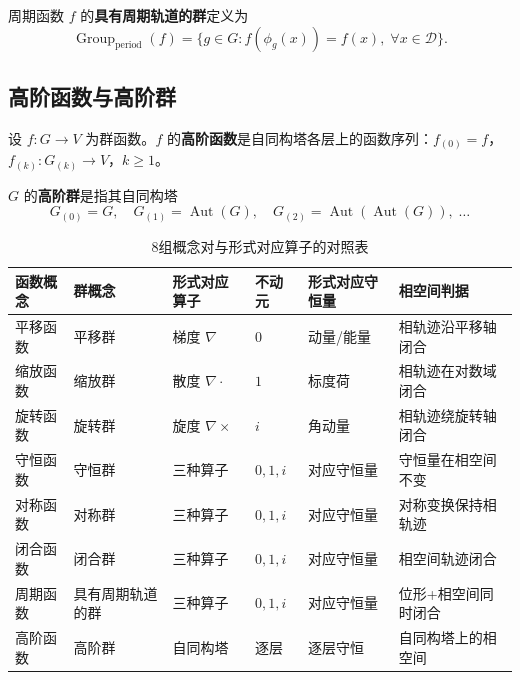 \begin{definition}[具有周期轨道的群]\label{def:group_with_periodic_orbits_gf}
周期函数 $f$ 的\textbf{具有周期轨道的群}定义为
\[
\operatorname{Group}_{\mathrm{period}}(f) = \{g \in G : f(\phi_g(x)) = f(x),\; \forall x \in \mathcal{D}\}.
\]
\end{definition}

\subsection{\texorpdfstring{高阶函数与高阶群}{高阶函数与高阶群}}

\begin{definition}[高阶函数]\label{def:higher_function_gf}
设 $f: G \to V$ 为群函数。$f$ 的\textbf{高阶函数}是自同构塔各层上的函数序列：$f_{(0)} = f$，$f_{(k)}: G_{(k)} \to V$，$k \ge 1$。
\end{definition}

\begin{definition}[高阶群]
\label{def:higher_group_gf}
$G$ 的\textbf{高阶群}是指其自同构塔
\[
G_{(0)} = G,\quad
G_{(1)} = \operatorname{Aut}(G),\quad
G_{(2)} = \operatorname{Aut}(\operatorname{Aut}(G)),\;\dots
\]
\end{definition}

\begin{table}[htbp]
    \centering
    \caption{8组概念对与形式对应算子的对照表}
    \label{tab:eight_concept_pairs}
    \begin{tabular}{>{\centering\arraybackslash}p{2.2cm}>{\centering\arraybackslash}p{2.2cm}>{\centering\arraybackslash}p{2cm}>{\centering\arraybackslash}p{2cm}>{\centering\arraybackslash}p{2.5cm}>{\centering\arraybackslash}p{2.5cm}}
        \toprule
        函数概念 & 群概念 & 形式对应算子 & 不动元 & 形式对应守恒量 & 相空间判据 \\
        \midrule
        平移函数 & 平移群 & 梯度 $\nabla$ & $0$ & 动量/能量 & 相轨迹沿平移轴闭合 \\
        缩放函数 & 缩放群 & 散度 $\nabla\cdot$ & $1$ & 标度荷 & 相轨迹在对数域闭合 \\
        旋转函数 & 旋转群 & 旋度 $\nabla\times$ & $i$ & 角动量 & 相轨迹绕旋转轴闭合 \\
        守恒函数 & 守恒群 & 三种算子 & $0,1,i$ & 对应守恒量 & 守恒量在相空间不变 \\
        对称函数 & 对称群 & 三种算子 & $0,1,i$ & 对应守恒量 & 对称变换保持相轨迹 \\
        闭合函数 & 闭合群 & 三种算子 & $0,1,i$ & 对应守恒量 & 相空间轨迹闭合 \\
        周期函数 & 具有周期轨道的群 & 三种算子 & $0,1,i$ & 对应守恒量 & 位形+相空间同时闭合 \\
        高阶函数 & 高阶群 & 自同构塔 & 逐层 & 逐层守恒 & 自同构塔上的相空间 \\
        \bottomrule
    \end{tabular}
\end{table}

